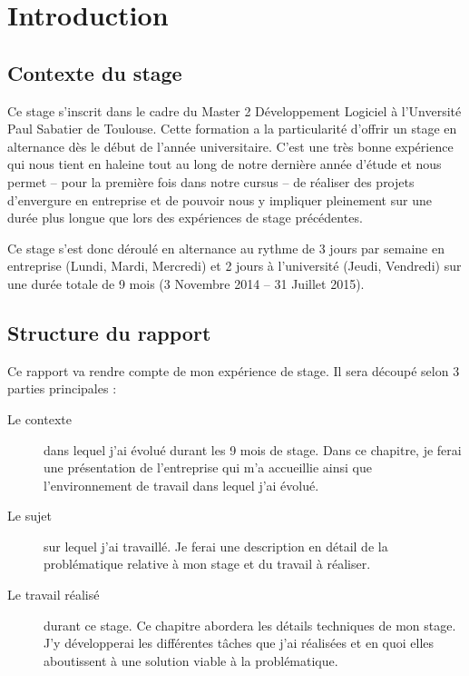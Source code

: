 \chapter{Introduction}

\section*{Contexte du stage}
Ce stage s'inscrit dans le cadre du Master 2 Développement Logiciel à l'Unversité Paul Sabatier de Toulouse. Cette formation a la particularité d'offrir un stage en alternance dès le début de l'année universitaire. C'est une très bonne expérience qui nous tient en haleine tout au long de notre dernière année d'étude et nous permet -- pour la première fois dans notre cursus -- de réaliser des projets d'envergure en entreprise et de pouvoir nous y impliquer pleinement sur une durée plus longue que lors des expériences de stage précédentes.

Ce stage s'est donc déroulé en alternance au rythme de 3 jours par semaine en entreprise (Lundi, Mardi, Mercredi) et 2 jours à l'université (Jeudi, Vendredi) sur une durée totale de 9 mois (3 Novembre 2014 -- 31 Juillet 2015).

\section*{Structure du rapport}
Ce rapport va rendre compte de mon expérience de stage. Il sera découpé selon 3 parties principales :
\begin{description}
	\item[Le contexte] dans lequel j'ai évolué durant les 9 mois de stage. Dans ce chapitre, je ferai une présentation de l'entreprise qui m'a accueillie ainsi que l'environnement de travail dans lequel j'ai évolué.
	\item[Le sujet] sur lequel j'ai travaillé. Je ferai une description en détail de la problématique relative à mon stage et du travail à réaliser.
	\item[Le travail réalisé] durant ce stage. Ce chapitre abordera les détails techniques de mon stage. J'y développerai les différentes tâches que j'ai réalisées et en quoi elles aboutissent à une solution viable à la problématique.
\end{description}


